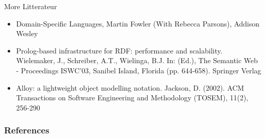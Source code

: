 \documentclass[slidetop,mathserif,red]{beamer}
\begin{document}
\begin{frame}{More Litterateur}
    \begin{itemize}
  

    \item Domain-Specific Languages, Martin Fowler (With Rebecca Parsons), Addison Wesley
    
    \item Prolog-based infrastructure for RDF: performance and scalability. Wielemaker, J., Schreiber, A.T., Wielinga, B.J.
In: (Ed.), The Semantic Web - Proceedings ISWC'03, Sanibel Island, Florida (pp. 644-658). Springer Verlag

	\item Alloy: a lightweight object modelling notation. Jackson, D. (2002). ACM Transactions on Software Engineering and Methodology (TOSEM), 11(2), 256-290  \cite{b1}
  \end{itemize}
  \end{frame}

\begin{frame}[allowframebreaks]
\frametitle{References}


\end{frame}



\end{document}
